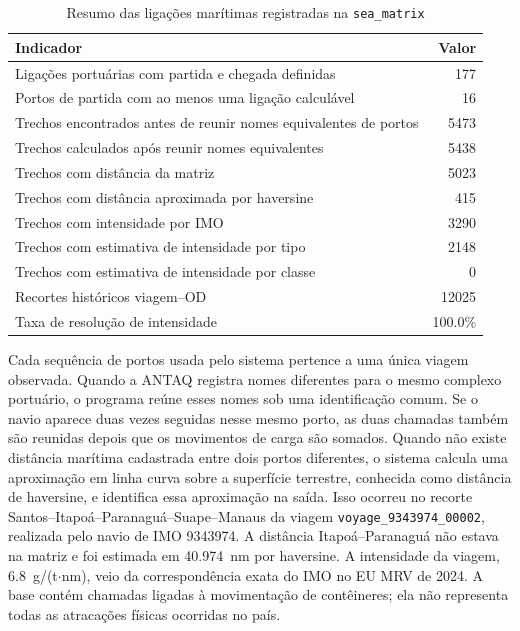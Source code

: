 \documentclass[12pt,a4paper]{report}
\begin{document}
\begin{table}[htbp]
\centering
\caption{Resumo das ligações marítimas registradas na \texttt{sea\_matrix}}
\label{tab:sea-matrix-summary}
\begin{tabular}{lr}
\toprule
Indicador & Valor \\
\midrule
Ligações portuárias com partida e chegada definidas & \num{177} \\
Portos de partida com ao menos uma ligação calculável & \num{16} \\
Trechos encontrados antes de reunir nomes equivalentes de portos & \num{5473} \\
Trechos calculados após reunir nomes equivalentes & \num{5438} \\
Trechos com distância da matriz & \num{5023} \\
Trechos com distância aproximada por haversine & \num{415} \\
Trechos com intensidade por IMO & \num{3290} \\
Trechos com estimativa de intensidade por tipo & \num{2148} \\
Trechos com estimativa de intensidade por classe & \num{0} \\
Recortes históricos viagem--OD & \num{12025} \\
Taxa de resolução de intensidade & \num{100.0}\% \\
\bottomrule
\end{tabular}
\end{table}

Cada sequência de portos usada pelo sistema pertence a uma única viagem observada. Quando a ANTAQ registra nomes diferentes para o mesmo complexo portuário, o programa reúne esses nomes sob uma identificação comum. Se o navio aparece duas vezes seguidas nesse mesmo porto, as duas chamadas também são reunidas depois que os movimentos de carga são somados. Quando não existe distância marítima cadastrada entre dois portos diferentes, o sistema calcula uma aproximação em linha curva sobre a superfície terrestre, conhecida como distância de haversine, e identifica essa aproximação na saída. Isso ocorreu no recorte Santos--Itapoá--Paranaguá--Suape--Manaus da viagem \texttt{voyage\_9343974\_00002}, realizada pelo navio de IMO 9343974. A distância Itapoá--Paranaguá não estava na matriz e foi estimada em \num{40.974}~nm por haversine. A intensidade da viagem, \num{6.8}~g/(t$\cdot$nm), veio da correspondência exata do IMO no EU MRV de 2024. A base contém chamadas ligadas à movimentação de contêineres; ela não representa todas as atracações físicas ocorridas no país.
\end{document}
